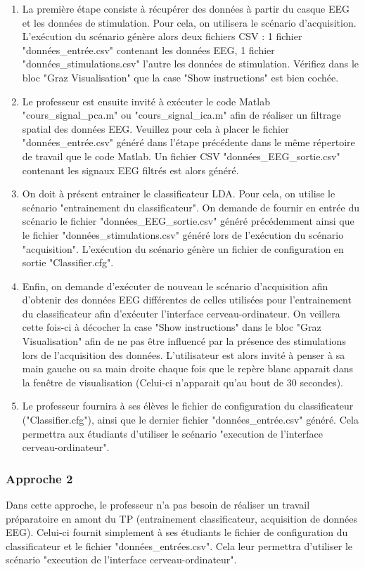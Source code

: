 \begin{enumerate}
	\item La première étape consiste à récupérer des données à partir du casque EEG et les données de stimulation. Pour cela, on utilisera le scénario d'acquisition. L'exécution du scénario génère alors deux fichiers CSV : 1 fichier "données\_entrée.csv" contenant les données EEG, 1 fichier "données\_stimulations.csv" l'autre les données de stimulation. Vérifiez dans le bloc "Graz Visualisation" que la case "Show instructions" est bien cochée.  
	\smallbreak 
	\item Le professeur est ensuite invité à exécuter le code Matlab "cours\_signal\_pca.m" ou "cours\_signal\_ica.m" afin de réaliser un filtrage spatial des données EEG. Veuillez pour cela à placer le fichier "données\_entrée.csv" généré dans l'étape précédente dans le même répertoire de travail que le code Matlab. Un fichier CSV "données\_EEG\_sortie.csv" contenant les signaux EEG filtrés est alors généré.
	\smallbreak
	\item On doit à présent entrainer le classificateur LDA. Pour cela, on utilise le scénario "entrainement du classificateur". On demande de fournir en entrée du scénario le fichier "données\_EEG\_sortie.csv" généré précédemment ainsi que le fichier "données\_stimulations.csv" généré lors de l'exécution du scénario "acquisition". L'exécution du scénario génère un fichier de configuration en sortie "Classifier.cfg".
	\smallbreak
	\item Enfin, on demande d'exécuter de nouveau le scénario d'acquisition afin d'obtenir des données EEG différentes de celles utilisées pour l'entrainement du classificateur afin d'exécuter l'interface cerveau-ordinateur. On veillera cette fois-ci à décocher la case "Show instructions" dans le bloc "Graz Visualisation" afin de ne pas être influencé par la présence des stimulations lors de l'acquisition des données. L'utilisateur est alors invité à penser à sa main gauche ou sa main droite chaque fois que le repère blanc apparait dans la fenêtre de visualisation (Celui-ci n'apparait qu'au bout de 30 secondes).
	\smallbreak
	\item Le professeur fournira à ses élèves le fichier de configuration du classificateur ("Classifier.cfg"), ainsi que le dernier fichier "données\_entrée.csv" généré. Cela permettra aux étudiants d'utiliser le scénario "execution de l'interface cerveau-ordinateur". 
\end{enumerate}


\subsubsection{Approche 2}
Dans cette approche, le professeur n'a pas besoin de réaliser un travail préparatoire en amont du TP (entrainement classificateur, acquisition de données EEG). Celui-ci fournit simplement à ses étudiants le fichier de configuration du classificateur et le fichier "données\_entrées.csv". Cela leur permettra d'utiliser le scénario "execution de l'interface cerveau-ordinateur".